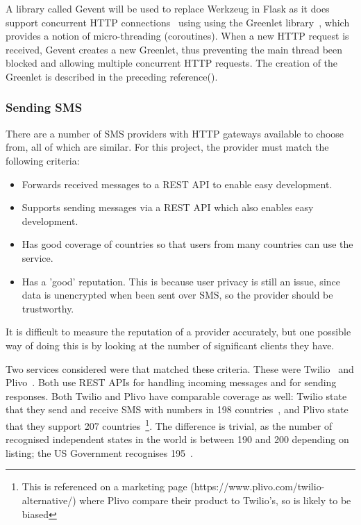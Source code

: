 \documentclass[authoryearcitations]{UoYCSproject}
\begin{document}
A library called Gevent will be used to replace Werkzeug in Flask as it does support concurrent HTTP connections~\cite{geventImplementingServers} using using the Greenlet library~\cite{libraryGreenlet}, which provides a notion of micro-threading (coroutines). When a new HTTP request is received, Gevent creates a new Greenlet, thus preventing the main thread been blocked and allowing multiple concurrent HTTP requests. The creation of the Greenlet is described in the preceding reference(\cite{geventImplementingServers}). 

\subsubsection{Sending SMS}
There are a number of SMS providers with HTTP gateways available to choose from, all of which are similar. For this project, the provider must match the following criteria:
\begin{itemize}
  \item Forwards received messages to a REST API to enable easy development.
  \item Supports sending messages via a REST API which also enables easy development.
  \item Has good coverage of countries so that users from many countries can use the service.
  \item Has a 'good' reputation. This is because user privacy is still an issue, since data is unencrypted when been sent over SMS, so the provider should be trustworthy.
\end{itemize}

It is difficult to measure the reputation of a provider accurately, but one possible way of doing this is by looking at the number of significant clients they have.

Two services considered were that matched these criteria.  These were Twilio~\cite{serviceTwilio} and Plivo~\cite{servicePlivo}. Both use REST APIs for handling incoming messages and for sending responses. Both Twilio and Plivo have comparable coverage as well: Twilio state that they send and receive SMS with numbers in 198 countries~\cite{twilioCoverage}, and Plivo state that they support 207 countries~\cite{plivoCoverage}\footnote{This is referenced on a marketing page (https://www.plivo.com/twilio-alternative/) where Plivo compare their product to Twilio's, so is likely to be biased}. The difference is trivial, as the number of recognised independent states in the world is between 190 and 200 depending on listing; the US Government recognises 195~\cite{usStateDepartmentListOfIndependentStates}.
\end{document}
